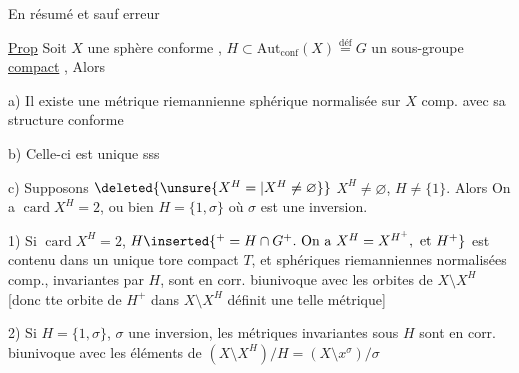 
En résumé et sauf erreur

\uline{Prop} Soit $X$ une sphère conforme , $H\subset\mathrm{Aut}_{\mathrm{conf}}(X)\overset{\mathrm{déf}}=G$ un sous-groupe \uline{compact} , Alors

a) Il existe une métrique riemannienne sphérique normalisée sur $X$ comp. avec sa structure conforme

b) Celle-ci est unique sss 

c) Supposons $\deleted{\unsure{X^H=|X^H\ne\varnothing}}$ $X^H\ne\varnothing$, $H\ne\{1\}$. Alors On a  $\operatorname{card}X^H=2$, ou bien $H=\{1,\sigma\}$ où $\sigma$ est une inversion.

1) Si $\operatorname{card}X^H=2$,  $H\inserted{{}^+=H\cap G^+.\ \text{On a }X^H=X^{H^+},\ \text{et }H^+}$ est contenu dans un unique tore compact $T$, et  sphériques riemanniennes normalisées comp., invariantes par  $H$, sont en corr. biunivoque avec les orbites de  \deleted{(}$X\setminus X^H$ [donc tte orbite de  $H^+$ dans $X\setminus X^H$ définit une telle métrique]


 2) Si $H=\{1,\sigma\}$, $\sigma$ une inversion, les métriques invariantes sous $H$ sont en corr. biunivoque avec les éléments de $(X\setminus X^H)/H=(X\setminus x^\sigma)/\sigma$
